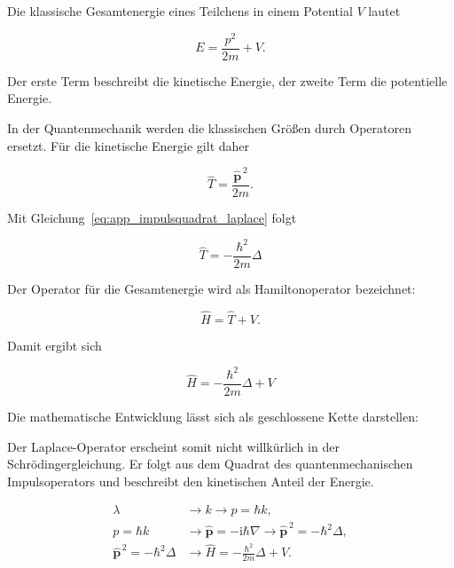 Die klassische Gesamtenergie eines Teilchens in einem Potential \(V\)
lautet

\begin{equation}
	E
	=
	\frac{p^2}{2m}
	+
	V.
	\label{eq:app_klassische_gesamtenergie}
\end{equation}

Der erste Term beschreibt die kinetische Energie, der zweite Term die
potentielle Energie.

In der Quantenmechanik werden die klassischen Größen durch Operatoren
ersetzt. Für die kinetische Energie gilt daher

\begin{equation}
	\hat{T}
	=
	\frac{\hat{\mathbf{p}}^{\,2}}{2m}.
\end{equation}

Mit Gleichung~\eqref{eq:app_impulsquadrat_laplace} folgt

\begin{equation}
	\boxed{
		\hat{T}
		=
		-\frac{\hbar^2}{2m}\Delta
	}
	\label{eq:app_kinetischer_energieoperator}
\end{equation}

Der Operator für die Gesamtenergie wird als Hamiltonoperator bezeichnet:

\begin{equation}
	\hat{H}
	=
	\hat{T}
	+
	V.
\end{equation}

Damit ergibt sich

\begin{equation}
	\boxed{
		\hat{H}
		=
		-\frac{\hbar^2}{2m}\Delta
		+
		V
	}
	\label{eq:app_hamiltonoperator_voraussetzung}
\end{equation}

\begin{DidacticBox}
	Die mathematische Entwicklung lässt sich als geschlossene Kette darstellen:
	

	
	Der Laplace-Operator erscheint somit nicht willkürlich in der
	Schrödingergleichung. Er folgt aus dem Quadrat des quantenmechanischen
	Impulsoperators und beschreibt den kinetischen Anteil der Energie.
\end{DidacticBox}


\begin{equation*}
	\begin{aligned}
		\lambda
		&\longrightarrow
		k
		\longrightarrow
		p=\hbar k,
		\\[4pt]
		p=\hbar k
		&\longrightarrow
		\hat{\mathbf{p}}
		=
		-\mathrm{i}\hbar\nabla
		\longrightarrow
		\hat{\mathbf{p}}^{\,2}
		=
		-\hbar^2\Delta,
		\\[4pt]
		\hat{\mathbf{p}}^{\,2}
		=
		-\hbar^2\Delta
		&\longrightarrow
		\hat{H}
		=
		-\frac{\hbar^2}{2m}\Delta+V.
	\end{aligned}
\end{equation*}






